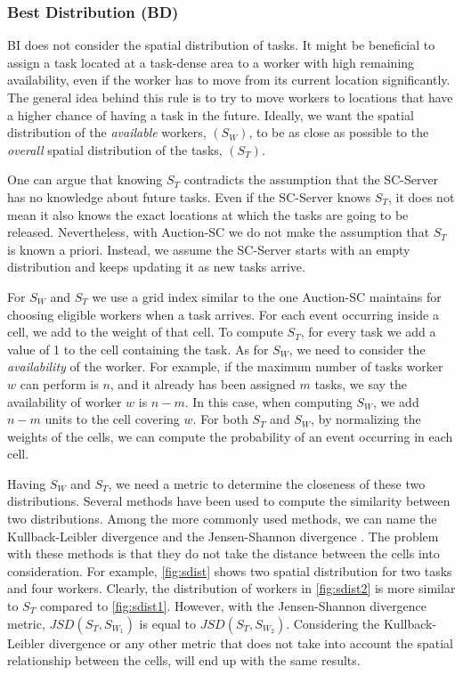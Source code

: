 \subsubsection{Best Distribution (BD)}

BI does not consider the spatial distribution of tasks. It might be beneficial to assign a task located at a task-dense area to a worker with high remaining availability, even if the worker has to move from its current location significantly. The general idea behind this rule is to try to move workers to locations that have a higher chance of having a task in the future. Ideally, we want the spatial distribution of the \textit{available} workers, $(S_W)$, to be as close as possible to the \textit{overall} spatial distribution of the tasks, $(S_T)$.

One can argue that knowing $S_T$ contradicts the assumption that the SC-Server has no knowledge about future tasks. Even if the SC-Server knows $S_T$, it does not mean it also knows the exact locations at which the tasks are going to be released. Nevertheless, with Auction-SC we do not make the assumption that $S_T$ is known a priori. Instead, we assume the SC-Server starts with an empty distribution and keeps updating it as new tasks arrive.

For $S_W$ and $S_T$ we use a grid index similar to the one Auction-SC maintains for choosing eligible workers when a task arrives. For each event occurring inside a cell, we add to the weight of that cell. To compute $S_T$, for every task we add a value of 1 to the cell containing the task. As for $S_W$, we need to consider the \textit{availability} of the worker. For example, if the maximum number of tasks worker $w$ can perform is $n$, and it already has been assigned $m$ tasks, we say the availability of worker $w$ is $n-m$. In this case, when computing $S_W$, we add $n-m$ units to the cell covering $w$. For both $S_T$ and $S_W$, by normalizing the weights of the cells, we can compute the probability of an event occurring in each cell.

Having $S_W$ and $S_T$, we need a metric to determine the closeness of these two distributions. Several methods have been used to compute the similarity between two distributions. Among the more commonly used methods, we can name the Kullback-Leibler divergence \cite{Kullback51} and the Jensen-Shannon divergence \cite{Lin91}. The problem with these methods is that they do not take the distance between the cells into consideration. For example, \cref{fig:sdist} shows two spatial distribution for two tasks and four workers. Clearly, the distribution of workers in \cref{fig:sdist2} is more similar to $S_T$ compared to \cref{fig:sdist1}. However, with the Jensen-Shannon divergence metric, $JSD(S_T, S_{W_1})$ is equal to $JSD(S_T, S_{W_2})$. Considering the Kullback-Leibler divergence or any other metric that does not take into account the spatial relationship between the cells, will end up with the same results.

